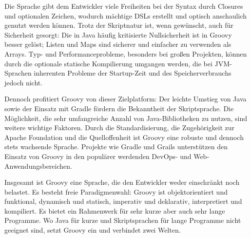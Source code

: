 \documentclass[a4paper]{article}
\begin{document}
Die Sprache gibt dem Entwickler viele Freiheiten bei der Syntax durch Closures und optionalen Zeichen, wodurch mächtige DSLs erstellt und optisch anschaulich genutzt werden können.
Trotz der Skriptnatur ist, wenn gewünscht, auch für Sicherheit gesorgt:
Die in Java häufig kritisierte Nullsicherheit ist in Groovy besser gelöst;
Listen und Maps sind sicherer und einfacher zu verwenden als Arrays.
Typ- und Performanceprobleme, besonders bei großen Projekten, können durch die optionale statische Kompilierung umgangen werden,
die bei JVM-Sprachen inherenten Probleme der Startup-Zeit und des Speicherverbrauchs jedoch nicht.

Dennoch profitiert Groovy von dieser Zielplatform:
Der leichte Umstieg von Java sowie der Einsatz mit Gradle fördern die Bekanntheit der Skriptsprache.
Die Möglichkeit, die sehr umfangreiche Anzahl von Java-Bibliotheken zu nutzen, sind weitere wichtige Faktoren.
Durch die Standardisierung, die Zugehörigkeit zur Apache Foundation und die Quelloffenheit ist Groovy eine robuste und dennoch stets wachsende Sprache.
Projekte wie Gradle und Grails unterstützen den Einsatz von Groovy in den populärer werdenden DevOps- und Web-Anwendungsbereichen.

Insgesamt ist Groovy eine Sprache, die den Entwickler weder einschränkt noch belastet.
Es besteht freie Paradigmenwahl:
Groovy ist objektorientiert und funktional, dynamisch und statisch, imperativ und deklarativ, interpretiert und kompiliert.
Es bietet ein Rahmenwerk für sehr kurze aber auch sehr lange Programme.
Wo Java für kurze und Skriptsprachen für lange Programme nicht geeignet sind, setzt Groovy ein und verbindet zwei Welten.



\begingroup
	\linespread{0}\selectfont %
	
\endgroup

\end{document}
